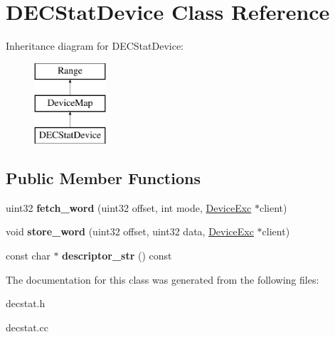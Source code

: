 \hypertarget{classDECStatDevice}{
\section{DECStatDevice Class Reference}
\label{classDECStatDevice}
}
Inheritance diagram for DECStatDevice:\begin{figure}[H]
\begin{center}
\leavevmode
\includegraphics[height=3cm]{classDECStatDevice}
\end{center}
\end{figure}
\subsection*{Public Member Functions}
\begin{DoxyCompactItemize}
\item 
\hypertarget{classDECStatDevice_a15ae2902970cd7ae144572cc169d2e9f}{
uint32 {\bfseries fetch\_\-word} (uint32 offset, int mode, \hyperlink{classDeviceExc}{DeviceExc} $\ast$client)}
\label{classDECStatDevice_a15ae2902970cd7ae144572cc169d2e9f}

\item 
\hypertarget{classDECStatDevice_a5e76b4735aae7b0a5f4475bc461b60a2}{
void {\bfseries store\_\-word} (uint32 offset, uint32 data, \hyperlink{classDeviceExc}{DeviceExc} $\ast$client)}
\label{classDECStatDevice_a5e76b4735aae7b0a5f4475bc461b60a2}

\item 
\hypertarget{classDECStatDevice_a1cdf5669b1c60823487f53628f7c164f}{
const char $\ast$ {\bfseries descriptor\_\-str} () const }
\label{classDECStatDevice_a1cdf5669b1c60823487f53628f7c164f}

\end{DoxyCompactItemize}


The documentation for this class was generated from the following files:\begin{DoxyCompactItemize}
\item 
decstat.h\item 
decstat.cc\end{DoxyCompactItemize}
